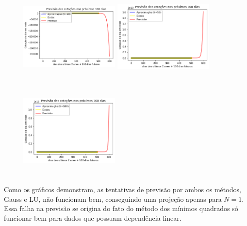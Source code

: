 \documentclass{article}
\begin{document}
\begin{figure}[!htb]
\includegraphics [width=5cm,height=5cm]{PrevisaoLU/P20.png}
\includegraphics [width=5cm,height=5cm]{PrevisaoLU/P50.png}
\includegraphics [width=5cm,height=5cm]{PrevisaoLU/P100.png}
\end{figure}

\newpage

\text Como os gráficos demonstram, as tentativas de previsão por ambos os métodos, Gauss e LU, não funcionam bem, conseguindo uma projeção apenas para $N = 1$. Essa falha na previsão se origina do fato do método dos mínimos quadrados só funcionar bem para dados que possuam dependência linear.
\end{document}
